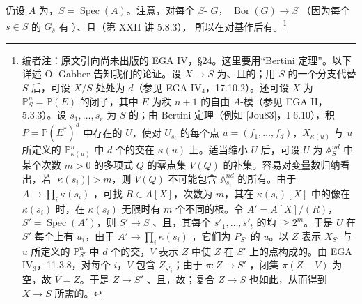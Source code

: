 仍设 $A$ 为，$S=\operatorname{Spec}(A)$。注意，对每个 $S$- $G$， $\operatorname{Bor}(G)\to S$ （因为每个 $s\in S$ 的 $G_{\bar s}$ 有 ）、且（第 XXII 讲 5.8.3），
所以在对基作后有。\footnote[15]{编者注：原文引向尚未出版的 EGA IV，§24。这里要用“Bertini 定理”。以下详述 O. Gabber 告知我们的论证。设 $X\to S$ 为、且的；用 $S$ 的一个分支代替 $S$ 后，可设 $X/S$ 处处为 $d$（参见 EGA IV$_4$，17.10.2）。还可设 $X$ 为 $\mathbb P^n_S=\mathbb P(E)$ 的闭子，其中 $E$ 为秩 $n+1$ 的自由 $A$-模（参见 EGA II，5.3.3）。设 $s_1,\ldots,s_r$ 为 $S$ 的；由 Bertini 定理（例如 [Jou83]，I 6.10），积 $P=\mathbb P(E^*)^d$ 中存在的 $U$，使对 $U_{s_i}$ 的每个点 $u=(f_1,\ldots,f_d)$，$X_{\kappa(u)}$ 与 $u$ 所定义的 $\mathbb P^n_{\kappa(u)}$ 中 $d$ 个的交在 $\kappa(u)$ 上。适当缩小 $U$ 后，可设 $U$ 为 $\mathbb A^{nd}_S$ 中某个次数 $m>0$ 的多项式 $Q$ 的零点集 $V(Q)$ 的补集。容易对变量数归纳看出，若 $|\kappa(s_i)|>m$，则 $V(Q)$ 不可能包含 $\mathbb A^{nd}_{s_i}$ 的所有。由于 $A\to\prod_i\kappa(s_i)$ ，可找 $R\in A[X]$，次数为 $m$，其在 $\kappa(s_i)[X]$ 中的像在 $\kappa(s_i)$ 时，在 $\kappa(s_i)$ 无限时有 $m$ 个不同的根。令 $A'=A[X]/(R)$，$S'=\operatorname{Spec}(A')$，则 $S'\to S$ 、且，其每个 $s'_1,\ldots,s'_t$ 的均 $\geq2^m$。于是 $U$ 在 $S'$ 每个上有 $u_i$，由于 $A'\to\prod_i\kappa(s_i)$ ，它们为 $P_{S'}$ 的 $u$。以 $Z$ 表示 $X_{S'}$ 与 $u$ 所定义的 $\mathbb P^n_{S'}$ 中 $d$ 个的交，$V$ 表示 $Z$ 中使 $Z$ 在 $S'$ 上的点构成的。由 EGA IV$_3$，11.3.8，对每个 $i$，$V$ 包含 $Z_{s'_i}$；由于 $\pi:Z\to S'$ ，闭集 $\pi(Z-V)$ 为空，故 $V=Z$。于是 $Z\to S'$ 、且，故；复合 $Z\to S$ 也如此，从而得到 $X\to S$ 所需的。}
